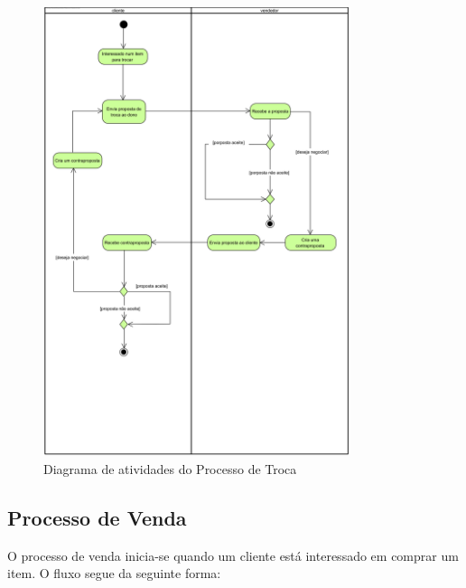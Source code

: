 \documentclass[a4paper, 12pt]{article} %
\begin{document}
\begin{figure}[ht]
	\centering
	\includegraphics[width=0.8\textwidth]{../images/activity-diagram-swaps.png}
	\caption{Diagrama de atividades do Processo de Troca}
	\label{fig:diagrama_atividades_troca}
\end{figure}

\newpage
\clearpage

\subsection{Processo de Venda}
O processo de venda inicia-se quando um cliente está interessado em comprar um item. O fluxo segue da seguinte forma:
\end{document}
